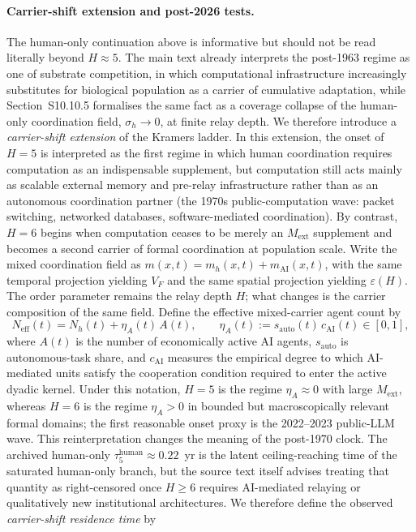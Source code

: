 \documentclass[11pt]{article}
\begin{document}
\paragraph{Carrier-shift extension and post-2026 tests.}
The human-only continuation above is informative but should not be read literally beyond $H\approx 5$.  The main text already interprets the post-1963 regime as one of substrate competition, in which computational infrastructure increasingly substitutes for biological population as a carrier of cumulative adaptation, while Section~S10.10.5 formalises the same fact as a coverage collapse of the human-only coordination field, $\sigma_h\to 0$, at finite relay depth.  We therefore introduce a \emph{carrier-shift extension} of the Kramers ladder.  In this extension, the onset of $H{=}5$ is interpreted as the first regime in which human coordination requires computation as an indispensable supplement, but computation still acts mainly as scalable external memory and pre-relay infrastructure rather than as an autonomous coordination partner (the 1970s public-computation wave: packet switching, networked databases, software-mediated coordination).  By contrast, $H{=}6$ begins when computation ceases to be merely an $M_{\mathrm{ext}}$ supplement and becomes a second carrier of formal coordination at population scale.  Write the mixed coordination field as $m(x,t)=m_h(x,t)+m_{\mathrm{AI}}(x,t)$, with the same temporal projection yielding $V_F$ and the same spatial projection yielding $\varepsilon(H)$.  The order parameter remains the relay depth $H$; what changes is the carrier composition of the same field.  Define the effective mixed-carrier agent count by
\[
N_{\mathrm{eff}}(t)=N_h(t)+\eta_A(t)\,A(t),\qquad \eta_A(t):=s_{\mathrm{auto}}(t)\,c_{\mathrm{AI}}(t)\in[0,1],
\]
where $A(t)$ is the number of economically active AI agents, $s_{\mathrm{auto}}$ is autonomous-task share, and $c_{\mathrm{AI}}$ measures the empirical degree to which AI-mediated units satisfy the cooperation condition required to enter the active dyadic kernel.  Under this notation, $H{=}5$ is the regime $\eta_A\approx 0$ with large $M_{\mathrm{ext}}$, whereas $H{=}6$ is the regime $\eta_A>0$ in bounded but macroscopically relevant formal domains; the first reasonable onset proxy is the 2022--2023 public-LLM wave.  This reinterpretation changes the meaning of the post-1970 clock.  The archived human-only $\tau_5^{\mathrm{human}}\approx 0.22$~yr is the latent ceiling-reaching time of the saturated human-only branch, but the source text itself advises treating that quantity as right-censored once $H{\ge}6$ requires AI-mediated relaying or qualitatively new institutional architectures.  We therefore define the observed \emph{carrier-shift residence time} by
\end{document}

